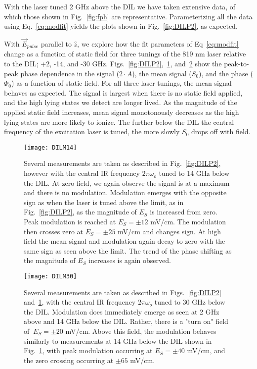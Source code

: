 \documentclass[aps,pra,preprint,groupedaddress]{revtex4-1}
\begin{document}
With the laser tuned 2 GHz above the DIL we have taken extensive data, of which those shown in Fig.~\ref{fig:fph} are representative. Parameterizing all the data using Eq.~\ref{eq:modfit} yields the plots shown in Fig.~\ref{fig:DILP2}, as expected, 

With $\vec{E}_{pulse}$ parallel to $\hat{z}$, we explore how the fit parameters of Eq~\ref{eq:modfit} change as a function of static field for three tunings of the 819 nm laser relative to the DIL; +2, -14, and -30 GHz. Figs.~\ref{fig:DILP2},~\ref{fig:DILM14}, and~\ref{fig:DILM30} show the peak-to-peak phase dependence in the signal ($2\cdot A$), the mean signal ($S_0$), and the phase ($\Phi_0$) as a function of static field. For all three laser tunings, the mean signal behaves as expected. The signal is largest when there is no static field applied, and the high lying states we detect are longer lived. As the magnitude of the applied static field increases, mean signal monotonously decreases as the high lying states are more likely to ionize. The further below the DIL the central frequency of the excitation laser is tuned, the more slowly $S_0$ drops off with field.

\begin{figure}
	\texttt{[image: DILM14]}
	\caption{Several measurements are taken as described in Fig.~\ref{fig:DILP2}, however with the central IR frequency $2\pi\omega_o$ tuned to 14 GHz below the DIL. At zero field, we again observe the signal is at a maximum and there is no modulation. Modulation emerges with the opposite sign as when the laser is tuned above the limit, as in Fig.~\ref{fig:DILP2}, as the magnitude of $E_S$ is increased from zero. Peak modulation is reached at $E_S = \pm 12$ mV/cm. The modulation then crosses zero at $E_S = \pm 25$ mV/cm and changes sign. At high field the mean signal and modulation again decay to zero with the same sign as seen above the limit. The trend of the phase shifting as the magnitude of $E_S$ increases is again observed.}
	\label{fig:DILM14}
\end{figure}

\begin{figure}
	\texttt{[image: DILM30]}
	\caption{Several measurements are taken as described in Figs.~\ref{fig:DILP2} and~\ref{fig:DILM14}, with the central IR frequency $2\pi\omega_o$ tuned to 30 GHz below the DIL. Modulation does immediately emerge as seen at 2 GHz above and 14 GHz below the DIL. Rather, there is a "turn on" field of $~ E_S = \pm 20$ mV/cm. Above this field, the modulation behaves similarly to measurements at 14 GHz below the DIL shown in Fig.~\ref{fig:DILM14}, with peak modulation occurring at $E_S = \pm 40$ mV/cm, and the zero crossing occurring at $\pm 65$ mV/cm.}
	\label{fig:DILM30}
\end{figure}
\end{document}
